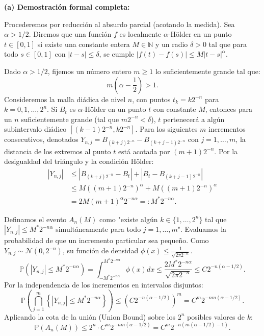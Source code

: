 \documentclass[11pt, letterpaper]{article}
\begin{document}
\begin{solucion}
    \vspace{3mm}
    \textbf{(a) Demostración formal completa:}

    Procederemos por reducción al absurdo parcial (acotando la medida). Sea $\alpha > 1/2$.
    Diremos que una función $f$ es localmente $\alpha$-Hölder en un punto $t \in [0,1]$ si existe una constante entera $M \in \mathbb{N}$ y un radio $\delta > 0$ tal que para todo $s \in [0,1]$ con $|t-s| \le \delta$, se cumple $|f(t) - f(s)| \le M|t-s|^\alpha$.

    Dado $\alpha > 1/2$, fijemos un número entero $m \ge 1$ lo suficientemente grande tal que:
    \[ m\left(\alpha - \frac{1}{2}\right) > 1. \]
    Consideremos la malla diádica de nivel $n$, con puntos $t_k = k2^{-n}$ para $k=0, 1, \dots, 2^n$.
    Si $B_t$ es $\alpha$-Hölder en un punto $t$ con constante $M$, entonces para un $n$ suficientemente grande (tal que $m 2^{-n} < \delta$), $t$ pertenecerá a algún subintervalo diádico $[(k-1)2^{-n}, k2^{-n}]$.
    Para los siguientes $m$ incrementos consecutivos, denotados $Y_{n,j} = B_{(k+j)2^{-n}} - B_{(k+j-1)2^{-n}}$ con $j=1, \dots, m$, la distancia de los extremos al punto $t$ está acotada por $(m+1)2^{-n}$.
    Por la desigualdad del triángulo y la condición Hölder:
    \begin{align*}
        |Y_{n,j}| &\le |B_{(k+j)2^{-n}} - B_t| + |B_t - B_{(k+j-1)2^{-n}}| \\
        &\le M\left((m+1)2^{-n}\right)^\alpha + M\left((m+1)2^{-n}\right)^\alpha \\
        &= 2M(m+1)^\alpha 2^{-n\alpha} =: M^* 2^{-n\alpha}.
    \end{align*}
    
    Definamos el evento $A_n(M)$ como "existe algún $k \in \{1, \dots, 2^n\}$ tal que $|Y_{n,j}| \le M^* 2^{-n\alpha}$ simultáneamente para todo $j=1, \dots, m$".
    Evaluamos la probabilidad de que un incremento particular sea pequeño. Como $Y_{n,j} \sim \mathcal{N}(0, 2^{-n})$, su función de densidad $\phi(x) \le \frac{1}{\sqrt{2\pi 2^{-n}}}$.
    \[ \mathbb{P}(|Y_{n,j}| \le M^* 2^{-n\alpha}) = \int_{-M^* 2^{-n\alpha}}^{M^* 2^{-n\alpha}} \phi(x) dx \le \frac{2M^* 2^{-n\alpha}}{\sqrt{2\pi 2^{-n}}} \le C 2^{-n(\alpha - 1/2)}. \]
    Por la independencia de los incrementos en intervalos disjuntos:
    \[ \mathbb{P}\left( \bigcap_{j=1}^m \left\{ |Y_{n,j}| \le M^* 2^{-n\alpha} \right\} \right) \le \left( C 2^{-n(\alpha - 1/2)} \right)^m = C^m 2^{-nm(\alpha - 1/2)}. \]
    Aplicando la cota de la unión (Union Bound) sobre los $2^n$ posibles valores de $k$:
    \[ \mathbb{P}(A_n(M)) \le 2^n \cdot C^m 2^{-nm(\alpha - 1/2)} = C^m 2^{-n(m(\alpha - 1/2) - 1)}. \]
    

\end{solucion}
\end{document}
